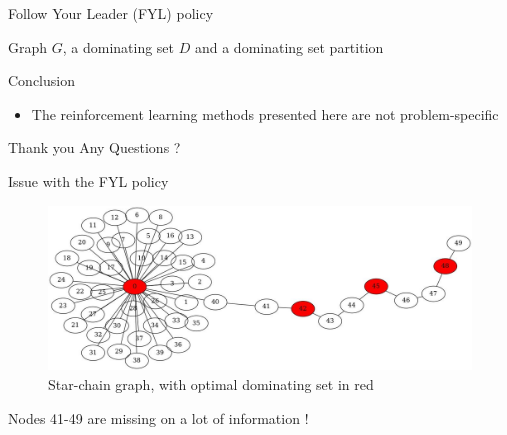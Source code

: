\documentclass{beamer}
\begin{document}
\begin{frame}{Follow Your Leader (FYL) policy}
  \begin{algorithmic}
     Graph $G$, a dominating set $D$ and a dominating set partition
 \end{algorithmic}
\end{frame}

\begin{frame}{Conclusion}
\begin{itemize}
\item The reinforcement learning methods presented here are \alert{not problem-specific}\end{itemize}
\end{frame}


\begin{frame}{Thank you}
\centering \Huge Any Questions ?
\end{frame}

\begin{frame}
\AtNextBibliography{\tiny}
\printbibliography
\end{frame}




\begin{frame}{Issue with the FYL policy}
\begin{figure}
\includegraphics[scale=0.25]{star-chain}
\caption{Star-chain graph, with optimal dominating set in red}
\end{figure}
Nodes 41-49 are \alert{missing on a lot of information} !
\end{frame}
\end{document}
